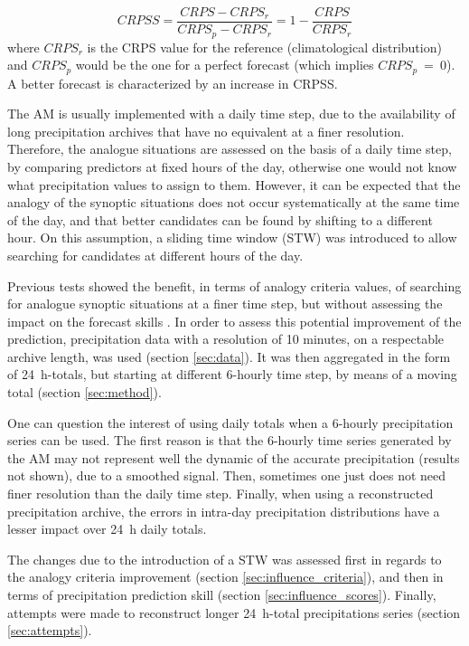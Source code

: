 \documentclass[hess]{copernicus}
\begin{document}
\begin{equation}
\label{eq:CRPSS}
CRPSS = \frac{CRPS-CRPS_{r}}{CRPS_{p}-CRPS_{r}} = 1-\frac{CRPS}{CRPS_{r}}
\end{equation}
where $CRPS_{r}$ is the CRPS value for the reference (climatological distribution) and $CRPS_{p}$ would be the one for a perfect forecast (which implies $CRPS_{p}~=~0$). A better forecast is characterized by an increase in CRPSS. 

The AM is usually implemented with a daily time step, due to the availability of long precipitation archives that have no equivalent at a finer resolution. Therefore, the analogue situations are assessed on the basis of a daily time step, by comparing predictors at fixed hours of the day, otherwise one would not know what precipitation values to assign to them. However, it can be expected that the analogy of the synoptic situations does not occur systematically at the same time of the day, and that better candidates can be found by shifting to a different hour. On this assumption, a sliding time window (STW) was introduced to allow searching for candidates at different hours of the day.

Previous tests showed the benefit, in terms of analogy criteria values, of searching for analogue synoptic situations at a finer time step, but without assessing the impact on the forecast skills \citep{Finet2008}. In order to assess this potential improvement of the prediction, precipitation data with a resolution of 10 minutes, on a respectable archive length, was used (section \ref{sec:data}). It was then aggregated in the form of 24~h-totals, but starting at different 6-hourly time step, by means of a moving total (section \ref{sec:method}). 

One can question the interest of using daily totals when a 6-hourly precipitation series can be used. The first reason is that the 6-hourly time series generated by the AM may not represent well the dynamic of the accurate precipitation (results not shown), due to a smoothed signal. Then, sometimes one just does not need finer resolution than the daily time step. Finally, when using a reconstructed precipitation archive, the errors in intra-day precipitation distributions have a lesser impact over 24~h daily totals.

The changes due to the introduction of a STW was assessed first in regards to the analogy criteria improvement (section \ref{sec:influence_criteria}), and then in terms of precipitation prediction skill (section \ref{sec:influence_scores}). Finally, attempts were made to reconstruct longer 24~h-total precipitations series (section \ref{sec:attempts}).
\end{document}
